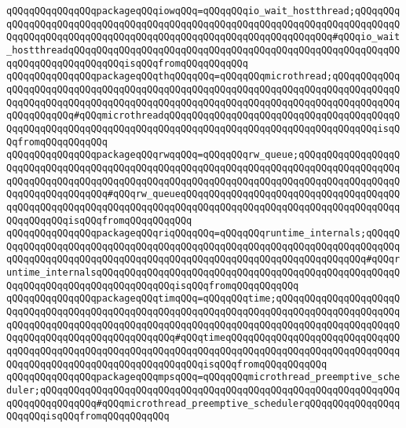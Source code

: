 \verb|qQQqqQQqqQQqqQQqpackageqQQqiowqQQq=qQQqqQQqio_wait_hostthread;qQQqqQQqqQQqqQQqqQQqqQQqqQQqqQQqqQQqqQQqqQQqqQQqqQQqqQQqqQQqqQQqqQQqqQQqqQQqqQQqqQQqqQQqqQQqqQQqqQQqqQQqqQQqqQQqqQQqqQQqqQQqqQQqqQQqqQQq#qQQqio_wait_hostthreadqQQqqQQqqQQqqQQqqQQqqQQqqQQqqQQqqQQqqQQqqQQqqQQqqQQqqQQqqQQqqQQqqQQqqQQqqQQqqQQqisqQQqfromqQQqqQQqqQQq|\newline
\verb|qQQqqQQqqQQqqQQqpackageqQQqthqQQqqQQq=qQQqqQQqmicrothread;qQQqqQQqqQQqqQQqqQQqqQQqqQQqqQQqqQQqqQQqqQQqqQQqqQQqqQQqqQQqqQQqqQQqqQQqqQQqqQQqqQQqqQQqqQQqqQQqqQQqqQQqqQQqqQQqqQQqqQQqqQQqqQQqqQQqqQQqqQQqqQQqqQQqqQQqqQQqqQQqqQQq#qQQqmicrothreadqQQqqQQqqQQqqQQqqQQqqQQqqQQqqQQqqQQqqQQqqQQqqQQqqQQqqQQqqQQqqQQqqQQqqQQqqQQqqQQqqQQqqQQqqQQqqQQqqQQqqQQqqQQqisqQQqfromqQQqqQQqqQQq|\newline
\verb|qQQqqQQqqQQqqQQqpackageqQQqrwqqQQq=qQQqqQQqrw_queue;qQQqqQQqqQQqqQQqqQQqqQQqqQQqqQQqqQQqqQQqqQQqqQQqqQQqqQQqqQQqqQQqqQQqqQQqqQQqqQQqqQQqqQQqqQQqqQQqqQQqqQQqqQQqqQQqqQQqqQQqqQQqqQQqqQQqqQQqqQQqqQQqqQQqqQQqqQQqqQQqqQQqqQQqqQQqqQQq#qQQqrw_queueqQQqqQQqqQQqqQQqqQQqqQQqqQQqqQQqqQQqqQQqqQQqqQQqqQQqqQQqqQQqqQQqqQQqqQQqqQQqqQQqqQQqqQQqqQQqqQQqqQQqqQQqqQQqqQQqqQQqqQQqisqQQqfromqQQqqQQqqQQq|\newline
\verb|qQQqqQQqqQQqqQQqpackageqQQqriqQQqqQQq=qQQqqQQqruntime_internals;qQQqqQQqqQQqqQQqqQQqqQQqqQQqqQQqqQQqqQQqqQQqqQQqqQQqqQQqqQQqqQQqqQQqqQQqqQQqqQQqqQQqqQQqqQQqqQQqqQQqqQQqqQQqqQQqqQQqqQQqqQQqqQQqqQQqqQQqqQQq#qQQqruntime_internalsqQQqqQQqqQQqqQQqqQQqqQQqqQQqqQQqqQQqqQQqqQQqqQQqqQQqqQQqqQQqqQQqqQQqqQQqqQQqqQQqqQQqisqQQqfromqQQqqQQqqQQq|\newline
\verb|qQQqqQQqqQQqqQQqpackageqQQqtimqQQq=qQQqqQQqtime;qQQqqQQqqQQqqQQqqQQqqQQqqQQqqQQqqQQqqQQqqQQqqQQqqQQqqQQqqQQqqQQqqQQqqQQqqQQqqQQqqQQqqQQqqQQqqQQqqQQqqQQqqQQqqQQqqQQqqQQqqQQqqQQqqQQqqQQqqQQqqQQqqQQqqQQqqQQqqQQqqQQqqQQqqQQqqQQqqQQqqQQqqQQqqQQq#qQQqtimeqQQqqQQqqQQqqQQqqQQqqQQqqQQqqQQqqQQqqQQqqQQqqQQqqQQqqQQqqQQqqQQqqQQqqQQqqQQqqQQqqQQqqQQqqQQqqQQqqQQqqQQqqQQqqQQqqQQqqQQqqQQqqQQqqQQqqQQqisqQQqfromqQQqqQQqqQQq|\newline
\verb|qQQqqQQqqQQqqQQqpackageqQQqmpsqQQq=qQQqqQQqmicrothread_preemptive_scheduler;qQQqqQQqqQQqqQQqqQQqqQQqqQQqqQQqqQQqqQQqqQQqqQQqqQQqqQQqqQQqqQQqqQQqqQQqqQQqqQQq#qQQqmicrothread_preemptive_schedulerqQQqqQQqqQQqqQQqqQQqqQQqisqQQqfromqQQqqQQqqQQq|\newline
